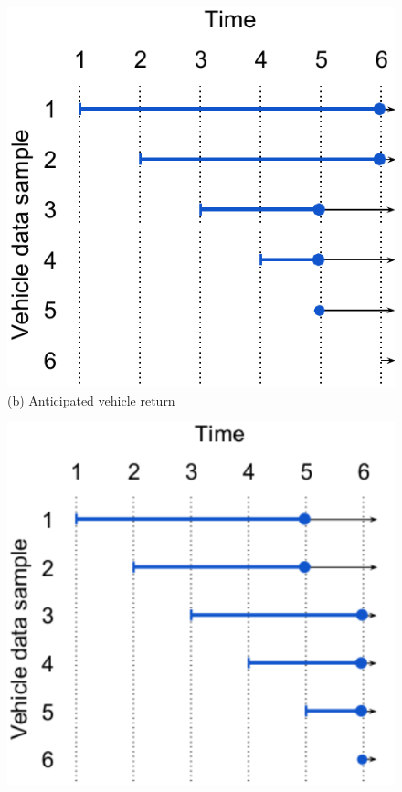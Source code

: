\begin{figure}[!htb]
\begin{minipage}[b]{0.32\columnwidth}
     \includegraphics[width=\linewidth]{modo_methodology/Cancelation_Situation.pdf}
     {\\(b) Anticipated vehicle return}
    \end{minipage}
    \begin{minipage}[b]{0.32\columnwidth}
     \centering
     \includegraphics[width=\linewidth]{modo_methodology/Consecutive_without_legend.pdf}

\end{minipage}
\end{figure}
